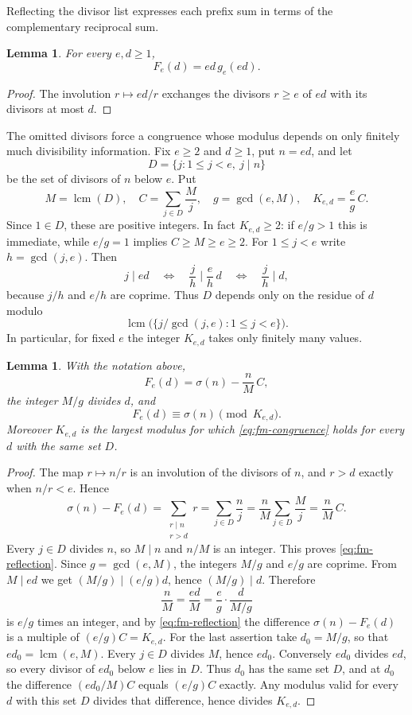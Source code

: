 \documentclass[11pt,letterpaper,reqno]{amsart}
\numberwithin{equation}{section}
\newtheorem{lemma}[theorem]{Lemma}
\theoremstyle{remark}
\newcommand{\1}{\mathbf 1}
\DeclareMathOperator{\lcm}{lcm}
\renewcommand{\leq}{\leqslant}
\renewcommand{\geq}{\geqslant}
\begin{document}
Reflecting the divisor list expresses each prefix sum in terms of the complementary reciprocal sum.

\begin{lemma}
For every $e,d\geq1$,
\begin{equation}\label{eq:reflection}
 F_e(d)=ed\,g_e(ed).
\end{equation}
\end{lemma}
\begin{proof}
The involution $r\mapsto ed/r$ exchanges the divisors $r\geq e$ of $ed$
with its divisors at most $d$.
\end{proof}

The omitted divisors force a congruence whose modulus depends on only
finitely much divisibility information. Fix $e\geq2$ and $d\geq1$, put $n=ed$, and let
\[
 D=\{j:1\leq j<e,\ j\mid n\}
\]
be the set of divisors of $n$ below $e$. Put
\[
 M=\lcm(D),\quad C=\sum_{j\in D}\frac Mj,\quad g=\gcd(e,M),\quad
 K_{e,d}=\frac eg\,C .
\]
Since $1\in D$, these are positive integers. In fact $K_{e,d}\geq2$: if $e/g>1$ this is immediate, while $e/g=1$ implies $C\geq M\geq e\geq2$. For $1\leq j<e$ write
$h=\gcd(j,e)$. Then
\[
 j\mid ed\quad\Longleftrightarrow\quad \frac jh\mid\frac eh\,d
 \quad\Longleftrightarrow\quad \frac jh\mid d,
\]
because $j/h$ and $e/h$ are coprime. Thus $D$ depends only on the residue
of $d$ modulo
\[
 \lcm\bigl(\{j/\gcd(j,e):1\leq j<e\}\bigr).
\]
In particular, for fixed $e$ the integer $K_{e,d}$ takes only finitely many
values.
\begin{lemma}\label{lem:fm-modulus}
With the notation above,
\begin{equation}\label{eq:fm-reflection}
 F_e(d)=\sigma(n)-\frac nM\,C ,
\end{equation}
the integer $M/g$ divides $d$, and
\begin{equation}\label{eq:fm-congruence}
 F_e(d)\equiv\sigma(n)\pmod{K_{e,d}} .
\end{equation}
Moreover $K_{e,d}$ is the largest modulus for which
\eqref{eq:fm-congruence} holds for every $d$ with the same set $D$.
\end{lemma}
\begin{proof}
The map $r\mapsto n/r$ is an involution of the divisors of $n$, and $r>d$
exactly when $n/r<e$. Hence
\[
 \sigma(n)-F_e(d)=\sum_{\substack{r\mid n\\ r>d}}r
 =\sum_{j\in D}\frac nj=\frac nM\sum_{j\in D}\frac Mj=\frac nM\,C .
\]
Every $j\in D$ divides $n$, so $M\mid n$ and $n/M$ is an integer. This
proves \eqref{eq:fm-reflection}.
Since $g=\gcd(e,M)$, the integers $M/g$ and $e/g$ are coprime. From
$M\mid ed$ we get $(M/g)\mid(e/g)d$, hence $(M/g)\mid d$. Therefore
\[
 \frac nM=\frac{ed}M=\frac eg\cdot\frac d{M/g}
\]
is $e/g$ times an integer, and by \eqref{eq:fm-reflection} the difference
$\sigma(n)-F_e(d)$ is a multiple of $(e/g)C=K_{e,d}$.
For the last assertion take $d_0=M/g$, so that $ed_0=\lcm(e,M)$. Every
$j\in D$ divides $M$, hence $ed_0$. Conversely $ed_0$ divides $ed$, so
every divisor of $ed_0$ below $e$ lies in $D$. Thus $d_0$ has the same set
$D$, and at $d_0$ the difference $(ed_0/M)C$ equals $(e/g)C$ exactly. Any
modulus valid for every $d$ with this set $D$ divides that difference,
hence divides $K_{e,d}$.
\end{proof}
\end{document}

